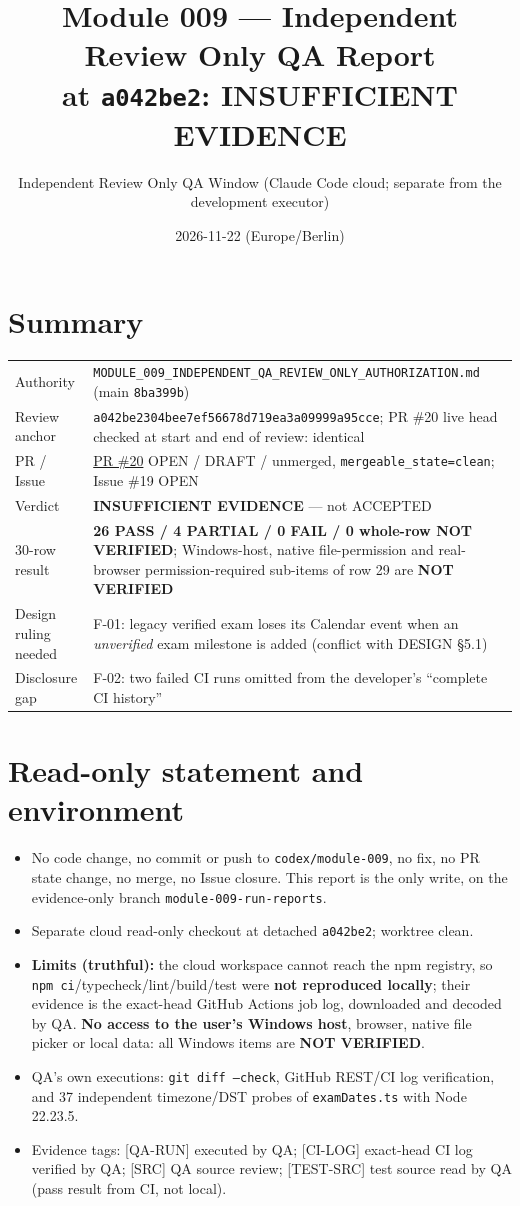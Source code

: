 \documentclass[11pt,a4paper]{article}
\title{Module 009 --- Independent Review Only QA Report\\at \texttt{a042be2}: \textbf{INSUFFICIENT EVIDENCE}}
\author{Independent Review Only QA Window (Claude Code cloud; separate from the development executor)}
\date{2026-11-22 (Europe/Berlin)}
\newcommand{\sha}[1]{\texttt{\small #1}}
\newcommand{\PASS}{\textcolor{green!50!black}{\textbf{PASS}}}
\newcommand{\PART}{\textcolor{orange!80!black}{\textbf{PARTIAL}}}
\newcommand{\FAIL}{\textcolor{red!70!black}{\textbf{FAIL}}}
\newcommand{\NV}{\textcolor{gray!60!black}{\textbf{NOT VERIFIED}}}
\begin{document}
\maketitle

\section*{Summary}
\begin{tabularx}{\textwidth}{@{}lY@{}}
\toprule
Authority & \texttt{MODULE\_009\_INDEPENDENT\_QA\_REVIEW\_ONLY\_AUTHORIZATION.md} (main \sha{8ba399b}) \\
Review anchor & \sha{a042be2304bee7ef56678d719ea3a09999a95cce}; PR \#20 live head checked at start and end of review: identical \\
PR / Issue & \href{https://github.com/zyyu1/personal-workspace/pull/20}{PR \#20} OPEN / DRAFT / unmerged, \texttt{mergeable\_state=clean}; Issue \#19 OPEN \\
Verdict & \textbf{INSUFFICIENT EVIDENCE} --- not ACCEPTED \\
30-row result & \textbf{26 \PASS{} / 4 \PART{} / 0 \FAIL{} / 0 whole-row \NV}; Windows-host, native file-permission and real-browser permission-required sub-items of row 29 are \NV \\
Design ruling needed & F-01: legacy verified exam loses its Calendar event when an \emph{unverified} exam milestone is added (conflict with DESIGN \S5.1) \\
Disclosure gap & F-02: two failed CI runs omitted from the developer's ``complete CI history'' \\
\bottomrule
\end{tabularx}

\section{Read-only statement and environment}
\begin{itemize}[nosep]
  \item No code change, no commit or push to \texttt{codex/module-009}, no fix, no PR state change, no merge, no Issue closure. This report is the only write, on the evidence-only branch \texttt{module-009-run-reports}.
  \item Separate cloud read-only checkout at detached \sha{a042be2}; worktree clean.
  \item \textbf{Limits (truthful):} the cloud workspace cannot reach the npm registry, so \texttt{npm ci}/typecheck/lint/build/test were \textbf{not reproduced locally}; their evidence is the exact-head GitHub Actions job log, downloaded and decoded by QA. \textbf{No access to the user's Windows host}, browser, native file picker or local data: all Windows items are \NV.
  \item QA's own executions: \texttt{git diff --check}, GitHub REST/CI log verification, and 37 independent timezone/DST probes of \texttt{examDates.ts} with Node 22.23.5.
  \item Evidence tags: [QA-RUN] executed by QA; [CI-LOG] exact-head CI log verified by QA; [SRC] QA source review; [TEST-SRC] test source read by QA (pass result from CI, not local).
\end{itemize}
\end{document}

